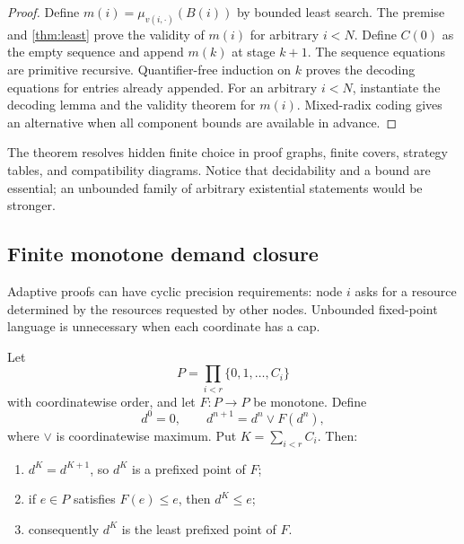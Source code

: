 \begin{proof}
Define \(m(i)=\mu_{v(i,\cdot)}(B(i))\) by bounded least search.  The premise and
\cref{thm:least} prove the validity of \(m(i)\) for arbitrary \(i<N\).  Define
\(C(0)\) as the empty sequence and append \(m(k)\) at stage \(k+1\).  The
sequence equations are primitive recursive.  Quantifier-free induction on
\(k\) proves the decoding equations for entries already appended.  For an
arbitrary \(i<N\), instantiate the decoding lemma and the validity theorem for
\(m(i)\).  Mixed-radix coding gives an alternative when all component bounds
are available in advance.
\end{proof}

The theorem resolves hidden finite choice in proof graphs, finite covers,
strategy tables, and compatibility diagrams.  Notice that decidability and a
bound are essential; an unbounded family of arbitrary existential statements
would be stronger.

\subsection{Finite monotone demand closure}

Adaptive proofs can have cyclic precision requirements: node \(i\) asks for a
resource determined by the resources requested by other nodes.  Unbounded
fixed-point language is unnecessary when each coordinate has a cap.

\begin{theorem}
\label{thm:demand-closure}
Let
\[
      P=\prod_{i<r}\{0,1,\ldots,C_i\}
\]
with coordinatewise order, and let \(F:P\to P\) be monotone.  Define
\[
 d^0=0,\qquad d^{n+1}=d^n\vee F(d^n),
\]
where \(\vee\) is coordinatewise maximum.  Put \(K=\sum_{i<r}C_i\).  Then:

\begin{enumerate}
\item \(d^K=d^{K+1}\), so \(d^K\) is a prefixed point of \(F\);
\item if \(e\in P\) satisfies \(F(e)\le e\), then \(d^K\le e\);
\item consequently \(d^K\) is the least prefixed point of \(F\).
\end{enumerate}
\end{theorem}

